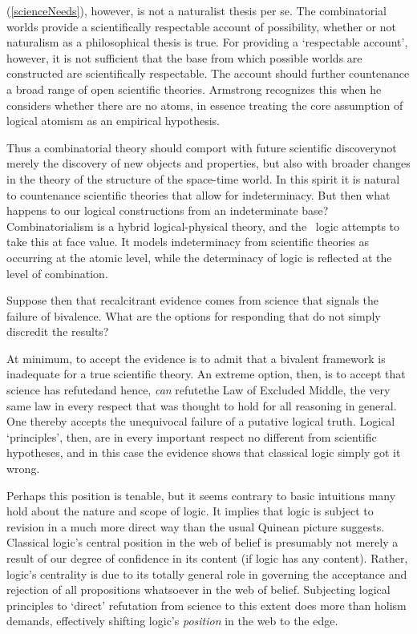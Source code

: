 (\ref{scienceNeeds}), however, is not a naturalist thesis per se. The combinatorial worlds provide a scientifically respectable account of possibility, whether or not naturalism as a philosophical thesis is true. For providing a `respectable account', however, it is not sufficient that the base from which possible worlds are constructed are scientifically respectable. The account should further countenance a broad range of open scientific theories. Armstrong recognizes this when he considers whether there are no atoms, in essence treating the core assumption of logical atomism as an empirical hypothesis. 

Thus a combinatorial theory should comport with future scientific discovery\textemdash not merely the discovery of new objects and properties, but also with broader changes in the theory of the structure of the space-time world. In this spirit it is natural to countenance scientific theories that allow for indeterminacy. But then what happens to our logical constructions from an indeterminate base? Combinatorialism is a hybrid logical-physical theory, and the \GO\ logic attempts to take this at face value. It models indeterminacy from scientific theories as occurring at the atomic level, while the determinacy of logic is reflected at the level of combination. 

Suppose then that recalcitrant evidence comes from science that signals the failure of bivalence. What are the options for responding that do not simply discredit the results? 

At minimum, to accept the evidence is to admit that a bivalent framework is inadequate for a true scientific theory. An extreme option, then, is to accept that science has refuted\textemdash and hence, \emph{can} refute\textemdash the Law of Excluded Middle, the very same law in every respect that was thought to hold for all reasoning in general. One thereby accepts the unequivocal failure of a putative logical truth. Logical `principles', then, are in every important respect no different from scientific hypotheses, and in this case the evidence shows that classical logic simply got it wrong.

Perhaps this position is tenable, but it seems contrary to basic intuitions many hold about the nature and scope of logic. It implies that logic is subject to revision in a much more direct way than the usual Quinean picture suggests. Classical logic's central position in the web of belief is presumably not merely a result of our degree of confidence in its content (if logic has any content). Rather, logic's centrality is due to its totally general role in governing the acceptance and rejection of all propositions whatsoever in the web of belief. Subjecting logical principles to `direct' refutation from science to this extent does more than holism demands, effectively shifting logic's \emph{position} in the web to the edge.


